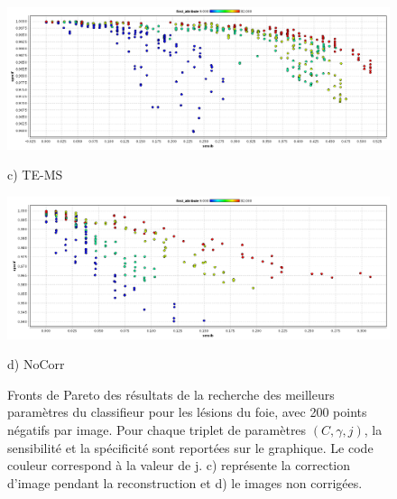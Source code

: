 \begin{figure}[h!]

\begin{center}
\includegraphics[width=14cm]{images/pareto_mod_LOR19.png}
 
{\small c) TE-MS}
\vspace{0.5cm}

\includegraphics[width=14cm]{images/pareto_mod_NoCorr19.png}

{\small d) NoCorr}

\end{center}
 \caption[(2/2) Fronts de Pareto des résultats de la recherche des meilleurs paramètres du classifieur pour les lésions du foie]{Fronts de Pareto des résultats de la recherche des meilleurs paramètres du classifieur pour les lésions du foie, avec 200 points négatifs par image. Pour chaque triplet de paramètres $(C, \gamma, j)$, la sensibilité et la spécificité sont reportées sur le graphique. Le code couleur correspond à la valeur de j. c) représente la correction d'image pendant la reconstruction et d) le images non corrigées.}
\label{fig:paretoModalite19_2} 
\end{figure}

